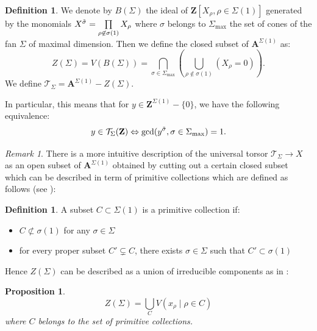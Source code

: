 \documentclass{proc-l}
\newcommand{\Z}{\mathbf{Z}}
\newcommand{\stackT}{\mathcal{T}}
\newcommand{\affine}{\mathbf{A}}
\newtheorem{prop}[theorem]{Proposition}
\theoremstyle{definition}
\newtheorem{definition}[theorem]{Definition}
\theoremstyle{remark}
\newtheorem{remark}[theorem]{Remark}
\numberwithin{equation}{section}
\begin{document}
\begin{definition}
    We denote by $B(\Sigma)$ the ideal of $\Z[X_{\rho},\rho \in \Sigma(1)]$ generated by the monomials $X^{\Tilde{\sigma}} = \prod\limits_{\rho \not\in \sigma(1)} X_{\rho}$ where $\sigma$ belongs to $\Sigma_{\max}$ the set of cones of the fan $\Sigma$ of maximal dimension. Then we define the closed subset of $\affine^{\Sigma(1)}$ as:
    \vspace{0,1 cm}
    $$Z(\Sigma) =  V(B(\Sigma)) = \bigcap\limits_{\sigma \in \Sigma_{\max}} \left( \bigcup\limits_{\rho \not\in \sigma(1)} \left( X_{\rho} = 0 \right) \right).$$We define $\stackT_{\Sigma} = \affine^{\Sigma(1)} - Z(\Sigma)$.
\end{definition}In particular, this means that for $y \in \Z^{\Sigma(1)}- \{0\}$, we have the following equivalence:
$$y \in \stackT_{\Sigma}(\Z) \Leftrightarrow \gcd(y^{\Tilde{\sigma}}, \sigma \in \Sigma_{\max}) = 1 .$$


\begin{remark}
    There is a more intuitive description of the universal torsor $\stackT_{\Sigma} \rightarrow X$  as an open subset of $\affine^{\Sigma(1)}$ obtained by cutting out a certain closed subset which can be described in term of primitive collections which are defined as follows (see \cite[definition 5.1.5]{CoxLittleSchenck2011}):

\begin{definition}\label{def_primitive_collection}
    A subset $C \subset \Sigma(1)$ is a primitive collection if:
\begin{itemize}
    \item $C \not\subset \sigma(1)$ for any $\sigma \in \Sigma$
    \item for every proper subset $C' \subsetneq C$, there exists $\sigma \in \Sigma$ such that $C' \subset \sigma(1)$
\end{itemize}
\end{definition}

Hence $Z(\Sigma)$ can be described as a union of irreducible components as in \cite[proposition 5.1.6]{CoxLittleSchenck2011}:
\begin{prop}\label{description_torseur_univ_primitive_collection}
    \vspace{0,1 cm}
    $$Z(\Sigma) = \bigcup\limits_{C} V( x_{\rho} \mid \rho \in C ) $$where $C$ belongs to the set of primitive collections.
\end{prop}
\end{remark}
\end{document}
